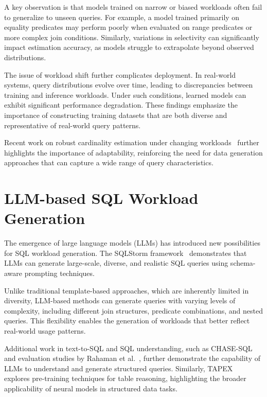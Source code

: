 A key observation is that models trained on narrow or biased workloads often fail to generalize to unseen queries. For example, a model trained primarily on equality predicates may perform poorly when evaluated on range predicates or more complex join conditions. Similarly, variations in selectivity can significantly impact estimation accuracy, as models struggle to extrapolate beyond observed distributions.

The issue of workload shift further complicates deployment. In real-world systems, query distributions evolve over time, leading to discrepancies between training and inference workloads. Under such conditions, learned models can exhibit significant performance degradation. These findings emphasize the importance of constructing training datasets that are both diverse and representative of real-world query patterns.

Recent work on robust cardinality estimation under changing workloads~\cite{DBLP:journals/pvldb/NegiWKTMMKA23} further highlights the importance of adaptability, reinforcing the need for data generation approaches that can capture a wide range of query characteristics.

\section{LLM-based SQL Workload Generation}

The emergence of large language models (LLMs) has introduced new possibilities for SQL workload generation. The SQLStorm framework~\cite{DBLP:journals/pvldb/SchmidtLBN25} demonstrates that LLMs can generate large-scale, diverse, and realistic SQL queries using schema-aware prompting techniques.

Unlike traditional template-based approaches, which are inherently limited in diversity, LLM-based methods can generate queries with varying levels of complexity, including different join structures, predicate combinations, and nested queries. This flexibility enables the generation of workloads that better reflect real-world usage patterns.

Additional work in text-to-SQL and SQL understanding, such as CHASE-SQL~\cite{DBLP:conf/iclr/PourrezaL0CTKGS25} and evaluation studies by Rahaman et al.~\cite{DBLP:conf/edbt/RahmanZMCP25}, further demonstrate the capability of LLMs to understand and generate structured queries. Similarly, TAPEX~\cite{DBLP:conf/iclr/LiuCGZLCL22} explores pre-training techniques for table reasoning, highlighting the broader applicability of neural models in structured data tasks.

